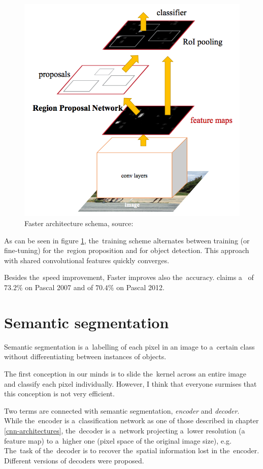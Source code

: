 \begin{figure}[H]
   \centering
	\includegraphics[width=.55\linewidth]{./pictures/fasterrcnn.png}
	\caption[Faster R-CNN architecture]{Faster  architecture schema, 
source: \cite{faster-rcnn}}
      \label{fig:faster-rcnn}
\end{figure}

As can be seen in figure \ref{fig:faster-rcnn}, the~training scheme alternates 
between training (or fine-tuning) for the~region proposition and for object 
detection. This approach with shared convolutional features quickly converges.

Besides the~speed improvement, Faster  improves also the~accuracy. 
\cite{faster-rcnn} claims a~ of $73.2 \%$ on Pascal  2007 and of 
$70.4 \%$ on Pascal  2012.


\section{Semantic segmentation}
\label{semantic-segmentation}

Semantic segmentation is a~labelling of each pixel in an image to a~certain 
class without differentiating between instances of objects.

The first conception in our minds is to slide the~kernel across an entire image 
and classify each pixel individually. However, I think that everyone surmises 
that this conception is not very efficient.

Two terms are connected with semantic segmentation, \textit{encoder} and 
\textit{decoder}. While the~encoder is a~classification network as one of those 
described in chapter \ref{cnn-architectures}, the~decoder is a~network 
projecting a~lower resolution (a feature map) to a~higher one (pixel space of 
the original image size), e.g. The~task of the~decoder is to recover the~spatial 
information lost in the~encoder. Different versions of decoders were proposed.

